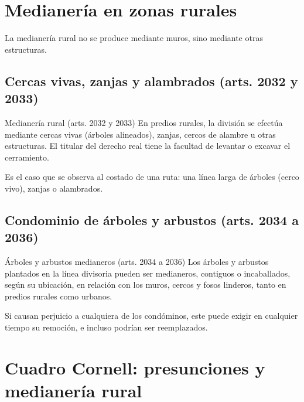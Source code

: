 \documentclass[12pt,oneside]{book}
\begin{document}
\section{Medianería en zonas rurales}

La medianería rural no se produce mediante muros, sino mediante otras estructuras.

\subsection{Cercas vivas, zanjas y alambrados (arts. 2032 y 2033)}

\begin{definition}{Medianería rural (arts. 2032 y 2033)}
En predios rurales, la división se efectúa mediante cercas vivas (árboles alineados), zanjas, cercos de alambre u otras estructuras. El titular del derecho real tiene la facultad de levantar o excavar el cerramiento.
\end{definition}

Es el caso que se observa al costado de una ruta: una línea larga de árboles (cerco vivo), zanjas o alambrados.

\subsection{Condominio de árboles y arbustos (arts. 2034 a 2036)}

\begin{definition}{Árboles y arbustos medianeros (arts. 2034 a 2036)}
Los árboles y arbustos plantados en la línea divisoria pueden ser medianeros, contiguos o incaballados, según su ubicación, en relación con los muros, cercos y fosos linderos, tanto en predios rurales como urbanos.
\end{definition}

Si causan perjuicio a cualquiera de los condóminos, este puede exigir en cualquier tiempo su remoción, e incluso podrían ser reemplazados. %

\section{Cuadro Cornell: presunciones y medianería rural}
\end{document}
